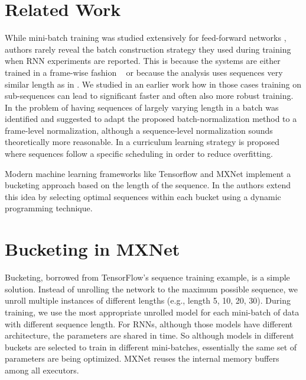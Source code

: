 \documentclass{article}
\begin{document}
  \section{Related Work} \label{sec:related}
  	While mini-batch training was studied extensively for feed-forward networks \cite{Li16}, authors rarely reveal the batch construction strategy they used during training when 
  	RNN experiments are reported. This is because the systems are either trained in a frame-wise
  	fashion ~\cite{2016arXiv161005256X} or because the analysis uses sequences very similar length as in \cite{PascanuMB13}. We studied in an earlier work \cite{Doetsch14} how in those cases training on sub-sequences can lead to significant faster and often also more robust training. 
  	In \cite{Laurent16} the problem of having sequences of largely varying length in a batch was identified and 
  	suggested to adapt the proposed batch-normalization method to a frame-level normalization, 
  	although a sequence-level normalization sounds theoretically more reasonable. In \cite{Bengio15} a curriculum learning strategy is proposed where sequences follow a specific scheduling in order to reduce overfitting.
  	
  	Modern machine learning frameworks like Tensorflow \cite{tensorflow} and 
  	MXNet \cite{mxnet} implement a bucketing approach based on the length of the sequence. In  \cite{Khomenko06} the authors extend this idea by selecting optimal sequences within each bucket using a dynamic programming technique.

  \section{Bucketing in MXNet} \label{sec:bucketing}
  Bucketing, borrowed from TensorFlow's sequence training example, is a simple solution. Instead of unrolling the network to the maximum possible sequence, we unroll multiple instances of different lengths (e.g., length 5, 10, 20, 30). During training, we use the most appropriate unrolled model for each mini-batch of data with different sequence length. For RNNs, although those models have different architecture, the parameters are shared in time. So although models in different buckets are selected to train in different mini-batches, essentially the same set of parameters are being optimized. MXNet reuses the internal memory buffers among all executors.
\end{document}
